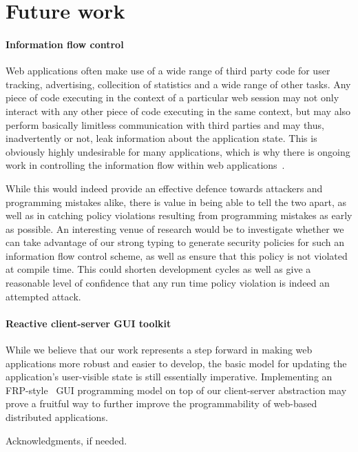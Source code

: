 \documentclass[preprint]{sigplanconf}
\begin{document}
\section{Future work}

\paragraph{Information flow control} Web applications often make use of a wide
range of third party code for user tracking, advertising, collecition of
statistics and a wide range of other tasks. Any piece of code executing in the
context of a particular web session may not only interact with any other piece
of code executing in the same context, but may also perform basically limitless
communication with third parties and may thus, inadvertently or not, leak
information about the application state. This is obviously highly undesirable
for many applications, which is why there is ongoing work in controlling the
information flow within web applications\ \cite{jsflow}.

While this would indeed provide an effective defence towards attackers and
programming mistakes alike, there is value in being able to tell the two apart,
as well as in catching policy violations resulting from programming mistakes
as early as possible. An interesting venue of research would be to investigate
whether we can take advantage of our strong typing to generate security policies
for such an information flow control scheme, as well as ensure that this policy
is not violated at compile time. This could shorten development cycles as well
as give a reasonable level of confidence that any run time policy violation is
indeed an attempted attack.

\paragraph{Reactive client-server GUI toolkit} While we believe that our work
represents a step forward in making web applications more robust and easier to
develop, the basic model for updating the application's user-visible state is
still essentially imperative. Implementing an FRP-style\ \cite{ppfrp} GUI
programming model on top of our client-server abstraction may prove a fruitful
way to further improve the programmability of web-based distributed
applications.

\acks

Acknowledgments, if needed.

\end{document}
